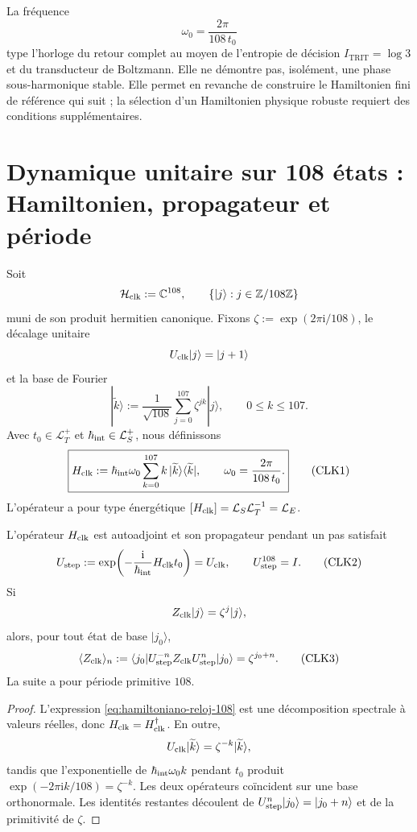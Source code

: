 La fréquence
\[
 \omega_0=\frac{2\pi}{108\,t_0}
\]
type l’horloge du retour complet au moyen de l’entropie de décision
\(I_{\mathrm{TRIT}}=\log 3\) et du transducteur de Boltzmann.
Elle ne démontre pas, isolément, une phase sous-harmonique stable. Elle permet en revanche de construire le
Hamiltonien fini de référence qui suit ; la sélection d’un Hamiltonien
physique robuste requiert des conditions supplémentaires.

\section{Dynamique unitaire sur 108 états : Hamiltonien, propagateur et période}
\label{sec:hamiltoniano-reloj-108}

Soit
\[
 \mathcal H_{\rm clk}:=\mathbb C^{108},
 \qquad
 \{|j\rangle:j\in\mathbb Z/108\mathbb Z\}
\]
muni de son produit hermitien canonique. Fixons
\(\zeta:=\exp(2\pi\mathrm i/108)\), le décalage unitaire
\[
 U_{\rm clk}|j\rangle=|j+1\rangle
\]
et la base de Fourier
\[
 |\widetilde k\rangle
 :=\frac1{\sqrt{108}}\sum_{j=0}^{107}\zeta^{jk}|j\rangle,
 \qquad 0\leq k\leq107.
\]
Avec \(t_0\in\mathcal L_T^+\) et
\(\hbar_{\rm int}\in\mathcal L_S^+\), nous définissons
\[
 \boxed{
 H_{\rm clk}
 :=\hbar_{\rm int}\omega_0
 \sum_{k=0}^{107}k\,
 |\widetilde k\rangle\langle\widetilde k|,
 \qquad
 \omega_0=\frac{2\pi}{108\,t_0}.}
 \tag{CLK1}\label{eq:hamiltoniano-reloj-108}
\]
L’opérateur a pour type énergétique
\([H_{\rm clk}]=\mathcal L_S\mathcal L_T^{-1}=\mathcal L_E\).

\begin{theorem}
\label{thm:reloj-unitario-108}
L’opérateur \(H_{\rm clk}\) est autoadjoint et son propagateur pendant un pas
satisfait
\[
 U_{\rm step}
 :=\exp\!\left(-\frac{\mathrm i}{\hbar_{\rm int}}
 H_{\rm clk}t_0\right)
 =U_{\rm clk},
 \qquad
 U_{\rm step}^{108}=I.
 \tag{CLK2}\label{eq:propagador-reloj-108}
\]
Si
\[
 Z_{\rm clk}|j\rangle=\zeta^j|j\rangle,
\]
alors, pour tout état de base \(|j_0\rangle\),
\[
 \langle Z_{\rm clk}\rangle_{n}
 :=\langle j_0|U_{\rm step}^{-n}Z_{\rm clk}
 U_{\rm step}^n|j_0\rangle
 =\zeta^{j_0+n}.
 \tag{CLK3}\label{eq:respuesta-reloj-108}
\]
La suite a pour période primitive \(108\).
\end{theorem}

\begin{proof}
L’expression \eqref{eq:hamiltoniano-reloj-108} est une décomposition
spectrale à valeurs réelles, donc \(H_{\rm clk}=H_{\rm clk}^\dagger\).
En outre,
\[
 U_{\rm clk}|\widetilde k\rangle
 =\zeta^{-k}|\widetilde k\rangle,
\]
tandis que l’exponentielle de
\(\hbar_{\rm int}\omega_0 k\) pendant \(t_0\) produit
\(\exp(-2\pi\mathrm ik/108)=\zeta^{-k}\). Les deux opérateurs coïncident sur
une base orthonormale. Les identités restantes découlent de
\(U_{\rm step}^n|j_0\rangle=|j_0+n\rangle\) et de la primitivité de
\(\zeta\).
\end{proof}

